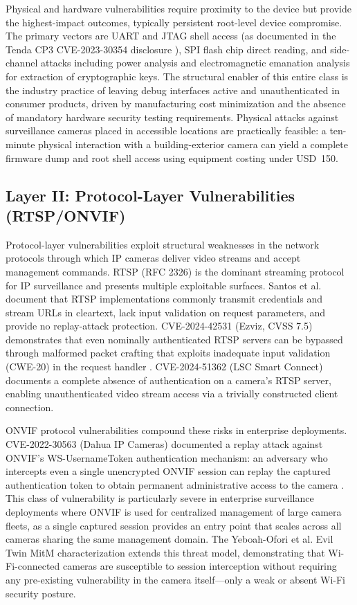 \documentclass[letterpaper, 10pt, conference]{ieeeconf}
\begin{document}
Physical and hardware vulnerabilities require proximity to the device
but provide the highest-impact outcomes, typically persistent root-level
device compromise. The primary vectors are UART and JTAG shell access
(as documented in the Tenda CP3 CVE-2023-30354 disclosure \cite{stabili2024}),
SPI flash chip direct reading, and side-channel attacks including power
analysis and electromagnetic emanation analysis for extraction of
cryptographic keys. The structural enabler of this entire class is the
industry practice of leaving debug interfaces active and unauthenticated
in consumer products, driven by manufacturing cost minimization and the
absence of mandatory hardware security testing requirements. Physical
attacks against surveillance cameras placed in accessible locations
are practically feasible: a ten-minute physical interaction with a
building-exterior camera can yield a complete firmware dump and root
shell access using equipment costing under USD~150.

\subsection{Layer II: Protocol-Layer Vulnerabilities (RTSP/ONVIF)}

Protocol-layer vulnerabilities exploit structural weaknesses in the
network protocols through which IP cameras deliver video streams and
accept management commands. RTSP (RFC 2326) is the dominant streaming
protocol for IP surveillance and presents multiple exploitable surfaces.
Santos et al.~\cite{santos2023} document that RTSP implementations
commonly transmit credentials and stream URLs in cleartext, lack
input validation on request parameters, and provide no replay-attack
protection. CVE-2024-42531 (Ezviz, CVSS 7.5) demonstrates that even
nominally authenticated RTSP servers can be bypassed through malformed
packet crafting that exploits inadequate input validation (CWE-20) in
the request handler \cite{ezviz2024}. CVE-2024-51362 (LSC Smart
Connect) documents a complete absence of authentication on a camera's
RTSP server, enabling unauthenticated video stream access via a
trivially constructed client connection.

ONVIF protocol vulnerabilities compound these risks in enterprise
deployments. CVE-2022-30563 (Dahua IP Cameras) documented a replay
attack against ONVIF's WS-UsernameToken authentication mechanism:
an adversary who intercepts even a single unencrypted ONVIF session
can replay the captured authentication token to obtain permanent
administrative access to the camera \cite{securithings2022}. This
class of vulnerability is particularly severe in enterprise
surveillance deployments where ONVIF is used for centralized
management of large camera fleets, as a single captured session
provides an entry point that scales across all cameras sharing the
same management domain. The Yeboah-Ofori et al. Evil Twin MitM
characterization \cite{yeboah2023} extends this threat model,
demonstrating that Wi-Fi-connected cameras are susceptible to
session interception without requiring any pre-existing vulnerability
in the camera itself---only a weak or absent Wi-Fi security posture.
\end{document}
